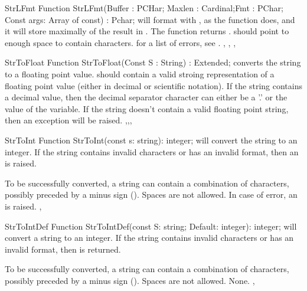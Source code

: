 

\begin{function}{StrLFmt}
\Declaration
Function StrLFmt(Buffer : PCHar; Maxlen : Cardinal;Fmt : PChar; Const args: Array of const) : Pchar;
\Description
{} will format  with , as the 
function does, and it will store maximally  of the
result in . The function returns . 
should point to enough space to contain  characters.
\Errors
for a list of errors, see .
\SeeAlso
{}, , , 
\end{function}


\begin{function}{StrToFloat}
\Declaration
Function StrToFloat(Const S : String) : Extended;
\Description
{} converts the string  to a floating point value.
 should contain a valid stroing representation of a floating point 
value (either in decimal or scientific notation). If the string
contains a decimal value, then the decimal separator character can either be
a '.' or the value of the  variable.
\Errors
If the string  doesn't contain a valid floating point string, then an
exception will be raised.
\SeeAlso
{},,,
\end{function}



\begin{function}{StrToInt}
\Declaration
Function StrToInt(const s: string): integer;
\Description
{} will convert the string to an integer.
If the string contains invalid characters or has an invalid format,
then an  is raised.

To be successfully converted, a string can contain a combination
of  characters, possibly preceded by a minus sign (\var{-}).
Spaces are not allowed.
\Errors
In case of error, an  is raised.
\SeeAlso
{}, 
\end{function}



\begin{function}{StrToIntDef}
\Declaration
Function StrToIntDef(const S: string; Default: integer): integer;
\Description
{} will convert a string to an integer. If the string contains
invalid characters or has an invalid format, then  is returned.

To be successfully converted, a string can contain a combination of
 characters, possibly preceded by a minus sign (\var{-}).
Spaces are not allowed.
\Errors
None.
\SeeAlso
{}, 
\end{function}

